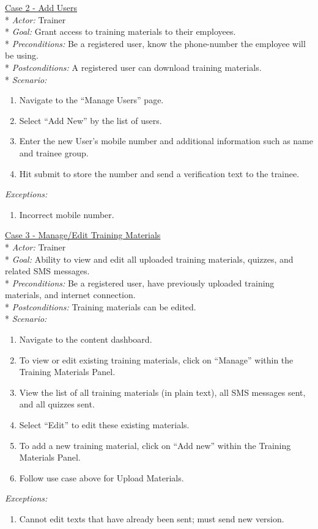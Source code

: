 \underline{Case 2 - Add Users}\\*
\textit{Actor:} Trainer\\*
\textit{Goal:} Grant access to training materials to their employees.\\*
\textit{Preconditions:} Be a registered user, know the phone-number the employee will be using.\\*
\textit{Postconditions:} A registered user can download training materials.\\*
\textit{Scenario:}
\begin{enumerate}
	\item{Navigate to the “Manage Users” page.}
	\item{Select “Add New” by the list of users.}
	\item{Enter the new User’s mobile number and additional information such as name and trainee group.}
	\item{Hit submit to store the number and send a verification text to the trainee.}
\end{enumerate}
\textit{Exceptions:}
\begin{enumerate}
	\item{Incorrect mobile number.}\\
\end{enumerate}

\underline{Case 3 - Manage/Edit Training Materials}\\*
\textit{Actor:} Trainer\\*
\textit{Goal:} Ability to view and edit all uploaded training materials, quizzes, and related SMS messages.\\*
\textit{Preconditions:} Be a registered user, have previously uploaded training materials, and internet connection.\\*
\textit{Postconditions:} Training materials can be edited.\\*
\textit{Scenario:}
\begin{enumerate}
	\item{Navigate to the content dashboard.}
	\item{To view or edit existing training materials, click on “Manage” within the Training Materials Panel.}
	\item{View the list of all training materials (in plain text), all SMS messages sent, and all quizzes sent.}
	\item{Select “Edit” to edit these existing materials.}
	\item{To add a new training material, click on “Add new” within the Training Materials Panel.}
	\item{Follow use case above for Upload Materials.}
\end{enumerate}
\textit{Exceptions:}
\begin{enumerate}
	\item{Cannot edit texts that have already been sent; must send new version.}\\
\end{enumerate}

